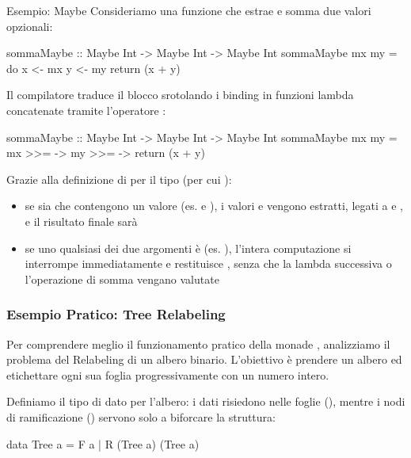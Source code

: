 \newpage
\begin{gframe}{Esempio: Maybe}
Consideriamo una funzione che estrae e somma due valori opzionali:

\begin{haskellbox}{}
sommaMaybe :: Maybe Int -> Maybe Int -> Maybe Int
sommaMaybe mx my = do
    x <- mx
    y <- my
    return (x + y)
\end{haskellbox}

Il compilatore traduce il blocco srotolando i binding in funzioni lambda concatenate tramite l'operatore \code{>>=}:

\begin{haskellbox}{}
sommaMaybe :: Maybe Int -> Maybe Int -> Maybe Int
sommaMaybe mx my = mx >>= \x ->
                   my >>= \y ->
                   return (x + y)
\end{haskellbox}

Grazie alla definizione di \code{>>=} per il tipo  (per cui ):
\begin{itemize}
    \item se sia  che  contengono un valore (es.  e ), i valori  e  vengono estratti, legati a  e , e il risultato finale sarà 
    \item se uno qualsiasi dei due argomenti è  (es. ), l'intera computazione si interrompe immediatamente e restituisce , senza che la lambda successiva o l'operazione di somma vengano valutate
\end{itemize}

\end{gframe}

\subsubsection{Esempio Pratico: Tree Relabeling}
Per comprendere meglio il funzionamento pratico della monade , analizziamo il problema del Relabeling di un albero binario. L'obiettivo è prendere un albero ed etichettare ogni sua foglia progressivamente con un numero intero.

Definiamo il tipo di dato per l'albero: i dati risiedono nelle foglie (), mentre i nodi di ramificazione () servono solo a biforcare la struttura:
\begin{haskellbox}{}
data Tree a = F a | R (Tree a) (Tree a)
\end{haskellbox}

